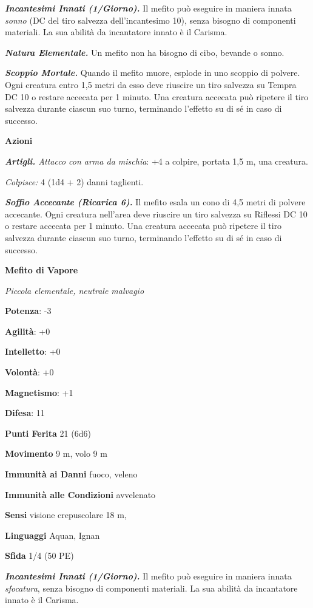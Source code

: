 \begin{multicols}{2}
\emph{\textbf{Incantesimi Innati (1/Giorno).}} Il mefito può eseguire in
maniera innata \emph{sonno} (DC del tiro salvezza dell'incantesimo 10),
senza bisogno di componenti materiali. La sua abilità da incantatore
innato è il Carisma.

\emph{\textbf{Natura Elementale.}} Un mefito non ha bisogno di cibo,
bevande o sonno.

\emph{\textbf{Scoppio Mortale.}} Quando il mefito muore, esplode in uno
scoppio di polvere. Ogni creatura entro 1,5 metri da esso deve riuscire
un tiro salvezza su Tempra DC 10 o restare accecata per 1 minuto.
Una creatura accecata può ripetere il tiro salvezza durante ciascun suo
turno, terminando l'effetto su di sé in caso di successo.

\textbf{Azioni}

\emph{\textbf{Artigli.} Attacco con arma da mischia}: +4 a colpire,
portata 1,5 m, una creatura.

\emph{Colpisce:} 4 (1d4 + 2) danni taglienti.

\emph{\textbf{Soffio Accecante (Ricarica 6).}} Il mefito esala un cono
di 4,5 metri di polvere accecante. Ogni creatura nell'area deve riuscire
un tiro salvezza su Riflessi DC 10 o restare accecata per 1 minuto. Una
creatura accecata può ripetere il tiro salvezza durante ciascun suo
turno, terminando l'effetto su di sé in caso di successo.

\textbf{Mefito di Vapore}

\emph{Piccola elementale, neutrale malvagio}

\textbf{Potenza}: -3

\textbf{Agilità}: +0

\textbf{Intelletto}: +0

\textbf{Volontà}: +0

\textbf{Magnetismo}: +1

\textbf{Difesa}: 11

\textbf{Punti Ferita} 21 (6d6)

\textbf{Movimento} 9 m, volo 9 m

\textbf{Immunità ai Danni} fuoco, veleno

\textbf{Immunità alle Condizioni} avvelenato

\textbf{Sensi} visione crepuscolare 18 m, 

\textbf{Linguaggi} Aquan, Ignan

\textbf{Sfida} 1/4 (50 PE)

\emph{\textbf{Incantesimi Innati (1/Giorno).}} Il mefito può eseguire in
maniera innata \emph{sfocatura}, senza bisogno di componenti materiali.
La sua abilità da incantatore innato è il Carisma.


\end{multicols}
